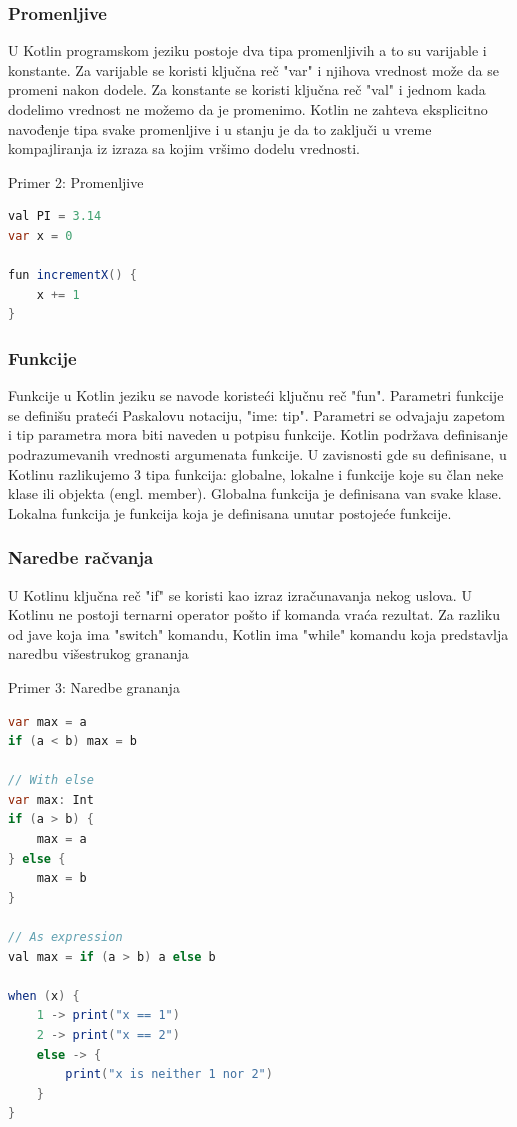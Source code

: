 \documentclass[12pt,oneside]{memoir}
\begin{document}
\subsubsection{Promenljive}
U Kotlin programskom jeziku postoje dva tipa promenljivih a to su varijable i konstante. Za varijable se koristi ključna reč "var" i njihova vrednost može da se promeni nakon dodele. Za konstante se koristi ključna reč "val" i jednom kada dodelimo vrednost ne možemo da je promenimo. Kotlin ne zahteva eksplicitno navođenje tipa svake promenljive i u stanju je da to zaključi u vreme kompajliranja iz izraza sa kojim vršimo dodelu vrednosti.

\begin{center} Primer 2: Promenljive\end{center}
\begin{lstlisting}[language=Java]
val PI = 3.14
var x = 0
 
fun incrementX() { 
    x += 1 
}
\end{lstlisting}
 
\subsubsection{Funkcije}
Funkcije u Kotlin jeziku se navode koristeći ključnu reč "fun". Parametri funkcije se definišu prateći Paskalovu notaciju, "ime: tip". Parametri se odvajaju zapetom i tip parametra mora biti naveden u potpisu funkcije. Kotlin podržava definisanje podrazumevanih vrednosti argumenata funkcije. U zavisnosti gde su definisane, u Kotlinu razlikujemo 3 tipa funkcija: globalne, lokalne i funkcije koje su član neke klase ili objekta (engl. member). Globalna funkcija je definisana van svake klase. Lokalna funkcija je funkcija koja je definisana unutar postojeće funkcije.
 
\subsubsection{Naredbe račvanja}
 
U Kotlinu ključna reč "if" se koristi kao izraz izračunavanja nekog uslova. U Kotlinu ne postoji ternarni operator pošto if komanda vraća rezultat. Za razliku od jave koja ima "switch" komandu, Kotlin ima "while" komandu koja predstavlja naredbu višestrukog grananja

\begin{center} Primer 3: Naredbe grananja\end{center}
\begin{lstlisting}[language=Java]
var max = a
if (a < b) max = b
 
// With else
var max: Int
if (a > b) {
    max = a
} else {
    max = b
}
 
// As expression
val max = if (a > b) a else b
 
when (x) {
    1 -> print("x == 1")
    2 -> print("x == 2")
    else -> {
        print("x is neither 1 nor 2")
    }
}
\end{lstlisting}
 
\end{document}

